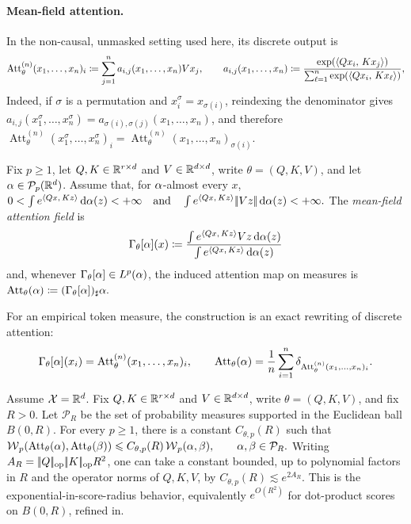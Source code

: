 \paragraph{Mean-field attention.}\label{par-mean-field-attention}
In the non-causal, unmasked setting used here, its discrete output is
\begin{equation}\label{eq-discrete-self-attention}
\operatorname{Att}^{(n)}_\theta(x_1,\ldots,x_n)_i
\coloneqq
\sum_{j=1}^n a_{i,j}(x_1,\ldots,x_n)Vx_j,
\qquad
a_{i,j}(x_1,\ldots,x_n)
\coloneqq
\frac{\exp(\langle Qx_i,\,Kx_j\rangle)}
{\sum_{\ell=1}^n\exp(\langle Qx_i,\,Kx_\ell\rangle)},
\end{equation}
Indeed, if \(\sigma\) is a permutation and \(x_i^\sigma=x_{\sigma(i)}\), reindexing the denominator gives \(a_{i,j}(x_1^\sigma,\ldots,x_n^\sigma)=a_{\sigma(i),\sigma(j)}(x_1,\ldots,x_n)\), and therefore
\(\operatorname{Att}^{(n)}_\theta(x_1^\sigma,\ldots,x_n^\sigma)_i = \operatorname{Att}^{(n)}_\theta(x_1,\ldots,x_n)_{\sigma(i)}.\)
\begin{defn}\label{def-mean-field-attention-map}
Fix \(p\geq1\), let $Q,K\in\mathbb{R}^{r\times d}$ and $V\in\mathbb{R}^{d\times d}$, write \(\theta=(Q,K,V)\), and let \(\alpha\in\mathcal{P}_p(\mathbb{R}^d)\). Assume that, for \(\alpha\)-almost every \(x\),
\(0<\int e^{\langle Qx,\,Kz\rangle}\,\mathrm{d}\alpha(z)<+\infty \quad \text{and} \quad \int e^{\langle Qx,\,Kz\rangle}|\!| Vz |\!|\,\mathrm{d}\alpha(z)<+\infty.\)
The \emph{mean-field attention field} is
\begin{equation}\label{eq-mean-field-attention}
\Gamma_\theta[\alpha](x)
\coloneqq
\frac{\int e^{\langle Qx,\,Kz\rangle}Vz\,\mathrm{d}\alpha(z)}
{\int e^{\langle Qx,\,Kz\rangle}\,\mathrm{d}\alpha(z)}
\end{equation}
and, whenever \(\Gamma_\theta[\alpha]\in L^p(\alpha)\), the induced attention map on measures is \(\operatorname{Att}_\theta(\alpha) \coloneqq (\Gamma_\theta[\alpha])_\sharp\alpha.\)
\end{defn}
For an empirical token measure, the construction is an exact rewriting of discrete attention:
\[
\Gamma_\theta[\alpha](x_i)
=
\operatorname{Att}^{(n)}_\theta(x_1,\ldots,x_n)_i,
\qquad
\operatorname{Att}_\theta(\alpha)
=
\frac1n\sum_{i=1}^n
\delta_{\operatorname{Att}^{(n)}_\theta(x_1,\ldots,x_n)_i}.
\]
\begin{prop}\label{prop-attention-wass-lipschitz}
Assume $\mathcal{X}=\mathbb{R}^d$. Fix $Q,K\in\mathbb{R}^{r\times d}$ and $V\in\mathbb{R}^{d\times d}$, write $\theta=(Q,K,V)$, and fix $R>0$. Let $\mathcal P_R$ be the set of probability measures supported in the Euclidean ball $B(0,R)$. For every $p\geq1$, there is a constant $C_{\theta,p}(R)$ such that
\(\operatorname{\mathcal{W}}_p(\operatorname{Att}_\theta(\alpha),\operatorname{Att}_\theta(\beta)) \leqslant C_{\theta,p}(R)\operatorname{\mathcal{W}}_p(\alpha,\beta), \qquad \alpha,\beta\in\mathcal P_R.\)
Writing $A_R=|\!| Q |\!|_{\rm op}|\!| K |\!|_{\rm op}R^2$, one can take a constant bounded, up to polynomial factors in $R$ and the operator norms of $Q,K,V$, by \(C_{\theta,p}(R)\lesssim e^{2A_R}.\)
This is the exponential-in-score-radius behavior, equivalently $e^{O(R^2)}$ for dot-product scores on $B(0,R)$, refined in.
\end{prop}

